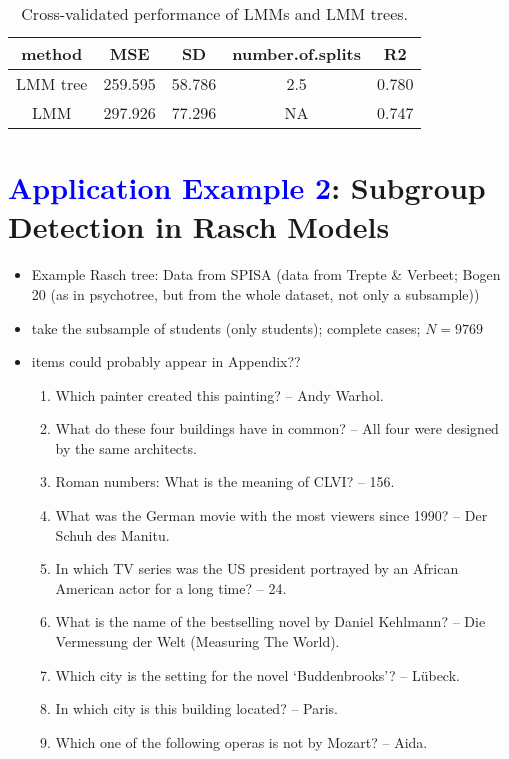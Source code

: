 \documentclass[doc,floatsintext,natbib]{apa7}
\newcommand{\edc}[1]{\textcolor{blue}{#1}}
\begin{document}
\begin{table}

\caption{\label{tab:performance}Cross-validated performance of LMMs and LMM trees.}
\begin{tabular}[t]{ccccc}
\toprule
method & MSE & SD & number.of.splits & R2\\
\midrule
LMM tree & 259.595 & 58.786 & 2.5 & 0.780\\
LMM & 297.926 & 77.296 & NA & 0.747\\
\bottomrule
\end{tabular}
\end{table}



\newpage
\FloatBarrier
\section{\edc{Application Example 2}: Subgroup Detection in Rasch Models}
\label{sec:TutorialRasch}



\begin{itemize}
\item Example Rasch tree: Data from SPISA (data from Trepte \& Verbeet; Bogen 20 (as in psychotree, but from the whole dataset, not only a subsample))
\item take the subsample of students (only students); complete cases; $N = 9769$
\item items could probably appear in Appendix??
\begin{enumerate}
\item Which painter created this painting? – Andy Warhol.
\item What do these four buildings have in common? – All four were designed by the same architects.
\item Roman numbers: What is the meaning of CLVI? – 156.
\item What was the German movie with the most viewers since 1990? – Der Schuh des Manitu.
\item In which TV series was the US president portrayed by an African American actor for a long time? – 24.
\item What is the name of the bestselling novel by Daniel Kehlmann? – Die Vermessung der Welt (Measuring The World).
\item Which city is the setting for the novel ‘Buddenbrooks’? – Lübeck.
\item In which city is this building located? – Paris.
\item Which one of the following operas is not by Mozart? – Aida.
\end{enumerate}
\end{itemize}
\end{document}
